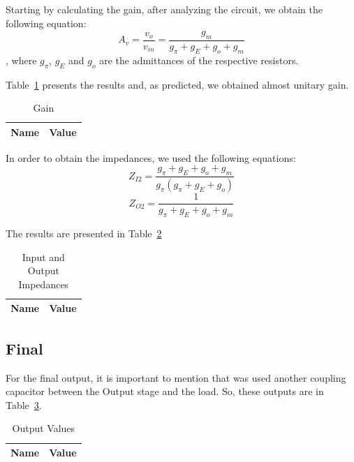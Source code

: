 Starting by calculating the gain, after analyzing the circuit, we obtain the following equation: 
\begin{equation}
	A_v=\frac{v_o}{v_{in}}=\frac{g_m}{g_\pi+g_E+g_o+g_m}
\end{equation}
, where $g_\pi$, $g_E$ and $g_o$ are the admittances of the respective resistors.

Table~\ref{tab:osav} presents the results and, as predicted, we obtained almost unitary gain.

\begin{table}[H]
  \centering
  \begin{tabular}{|l|r|}
     \hline    
    {\bf Name} & {\bf Value} \\ \hline   
    
  \end{tabular}
  \caption{Gain}
  \label{tab:osav}
\end{table}

In order to obtain the impedances, we used the following equations:
\begin{equation}
	Z_{I2}=\frac{g_\pi+g_E+g_o+g_m}{g_\pi(g_\pi+g_E+g_o)}
\end{equation}
\begin{equation}
	Z_{O2}=\frac{1}{g_\pi+g_E+g_o+g_m}
\end{equation}

The results are presented in Table~\ref{tab:osz}

\begin{table}[H]
  \centering
  \begin{tabular}{|l|r|}
     \hline    
    {\bf Name} & {\bf Value} \\ \hline   
    
  \end{tabular}
  \caption{Input and Output Impedances}
  \label{tab:osz}
\end{table}

\subsection{Final}
For the final output, it is important to mention that was used another coupling capacitor between the Output stage and the load.
So, these outputs are in Table~\ref{tab:finaltab}.

\begin{table}[H]
  \centering
  \begin{tabular}{|l|r|}
     \hline    
    {\bf Name} & {\bf Value} \\ \hline   
    
  \end{tabular}
  \caption{Output Values}
  \label{tab:finaltab}
\end{table}

